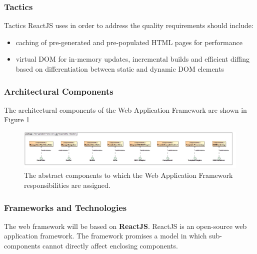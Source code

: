 \subsubsection{Tactics}
Tactics ReactJS uses in order to address the quality requirements should include:
\begin{itemize}
	\item caching of pre-generated and pre-populated HTML pages for performance
	\item virtual DOM for in-memory updates, incremental builds and efficient 
	diffing based on differentiation between static and dynamic DOM elements
\end{itemize}

\subsubsection{Architectural Components}
The architectural components of the  Web Application Framework are shown in Figure \ref{fig:webApplicationFrameworkResponsibilityAllocation}
\begin{figure}[H]
	\begin{center}
	\includegraphics[scale=0.35]{../Diagrams and Charts/Web Application Framework/ResponsibilityAllocation.jpg}
	\caption{The abstract components to which the Web Application Framework responsibilities are assigned.}
	\label{fig:webApplicationFrameworkResponsibilityAllocation}
	\end{center}
\end{figure}

\subsubsection{Frameworks and Technologies}
The web framework will be based on \textbf{ReactJS}. ReactJS is an open-source web
application framework. The framework promises a model in which sub-components
cannot directly affect enclosing components.

